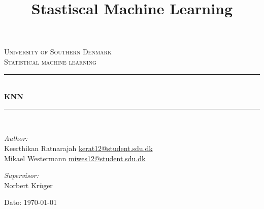 \documentclass[11pt]{report}
\title{Stastiscal Machine Learning }
\begin{document}
\begin{titlepage}
\begin{center}


\textsc{\LARGE University of Southern Denmark}\\[1.5cm]
\textsc{\Large Statistical machine learning}\\[0.5cm]
\vfill
\hrule ~\\[0.3cm]
{ \huge \bfseries KNN\\[0.4cm] }
\hrule ~\\[1.5cm]
\vfill

\noindent
\begin{minipage}{0.4\textwidth}
\begin{flushleft} \large
\emph{Author:}\\
Keerthikan Ratnarajah
\url{kerat12@student.sdu.dk}\\
Mikael Westermann
\url{miwes12@student.sdu.dk}
\end{flushleft}
\end{minipage}%
\begin{minipage}{0.4\textwidth}
\begin{flushright} \large
\emph{Supervisor:}\\
Norbert Kr\"{u}ger 
\end{flushright}
\end{minipage}

\vspace{1.2cm}
Dato: \today


\end{center}
\end{titlepage}

\tableofcontents

\newpage












\end{document}
